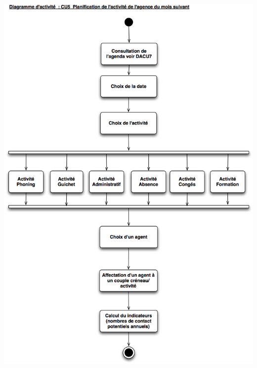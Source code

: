 \begin {center}
\includegraphics[width=\textwidth]{../../diagrammeActivite/DACU5.png}

\end{center}
